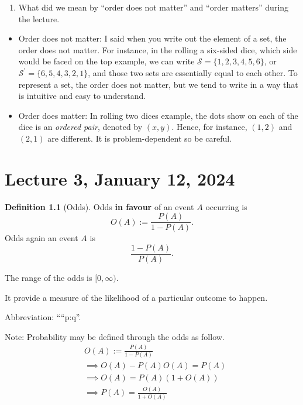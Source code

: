 \documentclass[
]{book}
\providecommand{\tightlist}{%
  \setlength{\itemsep}{0pt}\setlength{\parskip}{0pt}}
\theoremstyle{definition}
\newtheorem{definition}{Definition}[chapter]
\theoremstyle{definition}
\theoremstyle{definition}
\theoremstyle{definition}
\theoremstyle{remark}
\begin{document}
\begin{enumerate}
\def\labelenumi{\arabic{enumi}.}
\setcounter{enumi}{2}
\tightlist
\item
  What did we mean by ``order does not matter'' and ``order matters'' during the lecture.
\end{enumerate}

\begin{itemize}
\item
  Order does not matter: I said when you write out the element of a set, the order does not matter. For instance, in the rolling a six-sided dice, which side would be faced on the top example, we can write \(\mathcal{S} = \{1,2,3,4,5,6\}\), or \(\mathcal{S}^\prime=\{6,5,4,3,2,1\}\), and those two sets are essentially equal to each other. To represent a set, the order does not matter, but we tend to write in a way that is intuitive and easy to understand.
\item
  Order does matter: In rolling two dices example, the dots show on each of the dice is an \emph{ordered pair}, denoted by \((x,y)\). Hence, for instance, \((1,2)\) and \((2,1)\) are different. It is problem-dependent so be careful.
\end{itemize}

\hypertarget{lecture-3-january-12-2024}{%
\chapter{Lecture 3, January 12, 2024}\label{lecture-3-january-12-2024}}

\begin{definition}[Odds]
Odds \textbf{in favour} of an event \(A\) occurring is
\[
  O(A) := \frac{P(A)}{1-P(A)}.
\]
Odds again an event \(A\) is
\[
  \frac{1-P(A)}{P(A)}.
\]
\end{definition}

The range of the odds is \([0,\infty)\).

It provide a measure of the likelihood of a particular outcome to happen.

Abbreviation: ````p:q''.

Note: Probability may be defined through the odds as follow.
\begin{align*}
  &O(A) := \frac{P(A)}{1-P(A)} \\
  &\implies O(A) - P(A)O(A) = P(A) \\
  &\implies O(A) = P(A) (1+O(A)) \\
  &\implies P(A) = \frac{O(A)} {1+O(A)}
\end{align*}
\end{document}
